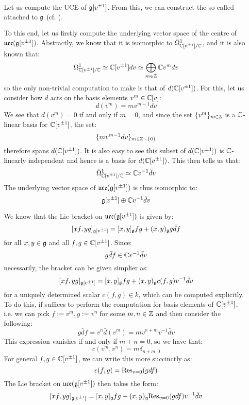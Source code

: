         \begin{example} \label{example: affine_lie_algebras_centres}
            Let us compute the UCE of $\mathfrak{g}[v^{\pm 1}]$. From this, we can construct the so-called  attached to $\mathfrak{g}$ (cf. \cite[Chapter 7]{kac_infinite_dimensional_lie_algebras}). 

            To this end, let us firstly compute the underlying vector space of the centre of $\mathfrak{uce}(\mathfrak{g}[v^{\pm 1}])$. Abstractly, we know that it is isomorphic to $\bar{\Omega}^1_{\mathbb{C}[v^{\pm 1}]/\mathbb{C}}$, and it is also known that:
                $$\Omega^1_{\mathbb{C}[v^{\pm 1}]/\mathbb{C}} \simeq \mathbb{C}[v^{\pm 1}] dv \simeq \bigoplus_{m \in \mathbb{Z}} \mathbb{C}  v^m dv$$
            so the only non-trivial computation to make is that of $d( \mathbb{C}[v^{\pm 1}] )$. For this, let us consider how $d$ acts on the basis elements $v^m \in \mathbb{C}[v]$:
                $$d(v^m) = m v^{m - 1} dv$$
            We see that $d(v^m) = 0$ if and only if $m = 0$, and since the set $\{v^m\}_{m \in \mathbb{Z}}$ is a $\mathbb{C}$-linear basis for $\mathbb{C}[v^{\pm 1}]$, the set:
                $$\{m v^{m - 1} dv\}_{m \in \mathbb{Z} \smallsetminus \{0\}}$$
            therefore spans $d(\mathbb{C}[v^{\pm 1}])$. It is also easy to see this subset of $d(\mathbb{C}[v^{\pm 1}])$ is $\mathbb{C}$-linearly independent and hence is a basis for $d(\mathbb{C}[v^{\pm 1}])$. This then tells us that:
                $$\bar{\Omega}^1_{\mathbb{C}[v^{\pm 1}]/\mathbb{C}} \simeq \mathbb{C}  v^{-1} \bar{d}v$$
            The underlying vector space of $\mathfrak{uce}(\mathfrak{g}[v^{\pm 1}])$ is thus isomorphic to:
                $$\mathfrak{g}[v^{\pm 1}] \oplus \mathbb{C}  v^{-1} \bar{d}v$$

            We know that the Lie bracket on $\mathfrak{uce}(\mathfrak{g}[v^{\pm 1}])$ is given by:
                $$[x f, y g]_{\mathfrak{g}[v^{\pm 1}]} = [x, y]_{\mathfrak{g}} fg + (x, y)_{\mathfrak{g}} g \bar{d}f$$
            for all $x, y \in \mathfrak{g}$ and all $f, g \in \mathbb{C}[v^{\pm 1}]$. Since:
                $$g \bar{d}f \in \mathbb{C}  v^{-1} \bar{d}v$$
            necessarily, the bracket can be given simplier as:
                $$[x f, y g]_{\mathfrak{g}[v^{\pm 1}]} = [x, y]_{\mathfrak{g}} fg + (x, y)_{\mathfrak{g}} c(f, g) v^{-1} \bar{d}v$$
            for a uniquely determined scalar $c(f, g) \in k$, which can be computed explicitly. To do this, if suffices to perform the computation for basis elements of $\mathbb{C}[v^{\pm 1}]$, i.e. we can pick $f := v^m, g := v^n$ for some $m, n \in \mathbb{Z}$ and then consider the following:
                $$g \bar{d}f = v^n \bar{d}(v^m) = m v^{n + m} v^{-1} \bar{d}v$$
            This expression vanishes if and only if $m + n = 0$, so we have that:
                $$c(v^m, v^n) = m \delta_{n + m, 0}$$
            For general $f, g \in \mathbb{C}[v^{\pm 1}]$, we can write this more succinctly as:
                $$c(f, g) = \mathrm{Res}_{v = 0}( gdf )$$
            The Lie bracket on $\mathfrak{uce}(\mathfrak{g}[v^{\pm 1}])$ then takes the form:
                $$[x f, y g]_{\mathfrak{g}[v^{\pm 1}]} = [x, y]_{\mathfrak{g}} fg + (x, y)_{\mathfrak{g}} \mathrm{Res}_{v = 0}(g df) v^{-1} \bar{d}v$$
                

\end{example}
